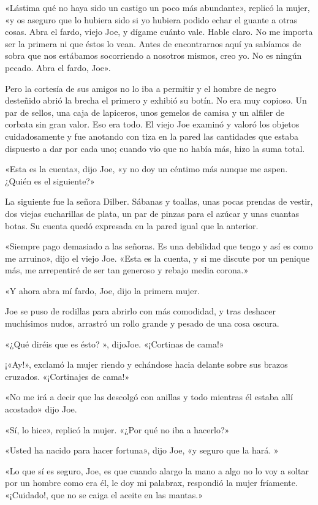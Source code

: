 \documentclass{novela}
\begin{document}
 «Lástima qué no haya sido un castigo un poco más abundante», replicó la mujer, «y os aseguro que lo hubiera sido si yo hubiera podido echar el guante a otras cosas. Abra el fardo, viejo Joe, y dígame cuánto vale. Hable claro. No me importa ser la primera ni que éstos lo vean. Antes de encontrarnos aquí ya sabíamos de sobra que nos estábamos socorriendo a nosotros mismos, creo yo. No es ningún pecado. Abra el fardo, Joe».

 Pero la cortesía de sus amigos no lo iba a permitir y el hombre de negro desteñido abrió la brecha el primero y exhibió su botín. No era muy copioso. Un par de sellos, una caja de lapiceros, unos gemelos de camisa y un alfiler de corbata sin gran valor. Eso era todo. El viejo Joe examinó y valoró los objetos cuidadosamente y fue anotando con tiza en la pared las cantidades que estaba dispuesto a dar por cada uno; cuando vio que no había más, hizo la suma total.

 «Esta es la cuenta», dijo Joe, «y no doy un céntimo más aunque me aspen. ¿Quién es el siguiente?»

 La siguiente fue la señora Dilber. Sábanas y toallas, unas pocas prendas de vestir, dos viejas cucharillas de plata, un par de pinzas para el azúcar y unas cuantas botas. Su cuenta quedó expresada en la pared igual que la anterior.

 «Siempre pago demasiado a las señoras. Es una debilidad que tengo y así es como me arruino», dijo el viejo Joe. «Esta es la cuenta, y si me discute por un penique más, me arrepentiré de ser tan generoso y rebajo media corona.»

 «Y ahora abra mí fardo, Joe, dijo la primera mujer.

 Joe se puso de rodillas para abrirlo con más comodidad, y tras deshacer muchísimos nudos, arrastró un rollo grande y pesado de una cosa oscura.

 «¿Qué diréis que es ésto? », dijoJoe. «¡Cortinas de cama!»

 ¡«Ay!», exclamó la mujer riendo y echándose hacia delante sobre sus brazos cruzados. «¡Cortinajes de cama!»

 «No me irá a decir que las descolgó con anillas y todo mientras él estaba allí acostado» dijo Joe.

 «Sí, lo hice», replicó la mujer. «¿Por qué no iba a hacerlo?»

 «Usted ha nacido para hacer fortuna», dijo Joe, «y seguro que la hará. »

 «Lo que sí es seguro, Joe, es que cuando alargo la mano a algo no lo voy a soltar por un hombre como era él, le doy mi palabrax, respondió la mujer fríamente. «¡Cuidado!, que no se caiga el aceite en las mantas.»
\end{document}
